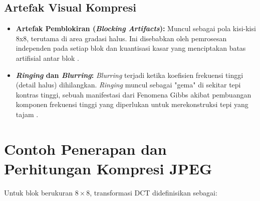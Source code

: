 \documentclass[a4paper]{article}
\begin{document}
\subsection{Artefak Visual Kompresi}
\begin{itemize}
  \item \textbf{Artefak Pemblokiran (\textit{Blocking Artifacts}):} Muncul sebagai pola kisi-kisi 8x8, terutama di area gradasi halus. Ini disebabkan oleh pemrosesan independen pada setiap blok dan kuantisasi kasar yang menciptakan batas artifisial antar blok \cite{singh2012blocking, chou1998smoothing}.
  \item \textbf{\textit{Ringing} dan \textit{Blurring}:} \textit{Blurring} terjadi ketika koefisien frekuensi tinggi (detail halus) dihilangkan. \textit{Ringing} muncul sebagai "gema" di sekitar tepi kontras tinggi, sebuah manifestasi dari Fenomena Gibbs akibat pembuangan komponen frekuensi tinggi yang diperlukan untuk merekonstruksi tepi yang tajam \cite{gottlieb1996gibbs, marziliano2004perceptual}.
\end{itemize}

\begin{table}[h!]
  \centering
  \caption{Perbandingan Kualitas vs. Tingkat Kompresi JPEG}
  \label{tab:kualitas_jpeg}
\end{table}

\section{Contoh Penerapan dan Perhitungan Kompresi JPEG}
Untuk blok berukuran $8\times8$, transformasi DCT didefinisikan sebagai:
\end{document}
